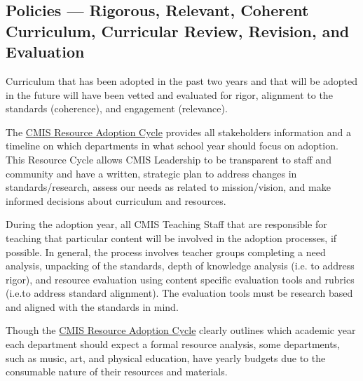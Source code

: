 \documentclass{report}
\begin{document}
\subsection{Policies — Rigorous, Relevant, Coherent Curriculum, Curricular Review, Revision, and Evaluation}



\begin{findings}
Curriculum that has been adopted in the past two years and that will be adopted in the future will have been vetted and evaluated for rigor, alignment to the standards (coherence), and engagement (relevance). 


The \href{https://docs.google.com/a/cmis.ac.th/document/d/1hh1nLUlJgg1hd7s6aG3u3We0L6o7Wg_ECdjc2f6DcT8/edit?usp=sharing}{CMIS Resource Adoption Cycle} provides all stakeholders information and a timeline on which departments in what school year should focus on adoption. This Resource Cycle allows CMIS Leadership to be transparent to staff and community and have a written, strategic plan to address changes in standards/research, assess our needs as related to mission/vision, and make informed decisions about curriculum and resources. 

During the adoption year, all CMIS Teaching Staff that are responsible for teaching that particular content will be involved in the adoption processes, if possible. In general, the process involves teacher groups completing a need analysis, unpacking of the standards, depth of knowledge analysis (i.e. to address rigor), and resource evaluation using content specific evaluation tools and rubrics (i.e.to address standard alignment). The evaluation tools must be research based and aligned with the standards in mind. 

Though the \href{https://docs.google.com/a/cmis.ac.th/document/d/1hh1nLUlJgg1hd7s6aG3u3We0L6o7Wg_ECdjc2f6DcT8/edit?usp=sharing}{CMIS Resource Adoption Cycle} clearly outlines which academic year each department should expect a formal resource analysis, some departments, such as music, art, and physical education, have yearly budgets due to the consumable nature of their resources and materials. 


\end{findings}
\end{document}
